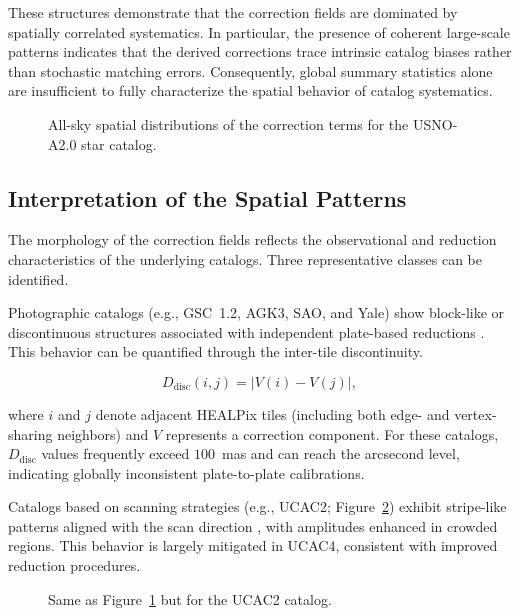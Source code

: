 \documentclass[linenumbers,amsmath,manuscript]{aastex702}
\begin{document}
These structures demonstrate that the correction fields are dominated by spatially correlated systematics. In particular, the presence of coherent large-scale patterns indicates that the derived corrections trace intrinsic catalog biases rather than stochastic matching errors. Consequently, global summary statistics alone are insufficient to fully characterize the spatial behavior of catalog systematics.

\begin{figure}[ht!]
\caption{All-sky spatial distributions of the correction terms for the USNO-A2.0 star catalog.}
\label{fig:bias_usno_a2_2x2}
\end{figure}

\subsection{Interpretation of the Spatial Patterns} \label{subsec:interpretation}

The morphology of the correction fields reflects the observational and reduction characteristics of the underlying catalogs. Three representative classes can be identified.

Photographic catalogs (e.g., GSC~1.2, AGK3, SAO, and Yale) show block-like or discontinuous structures associated with independent plate-based reductions \citep{Platais1998,Eichhorn1974}. This behavior can be quantified through the inter-tile discontinuity.

\begin{equation}
D_{\mathrm{disc}}(i,j)=|V(i)-V(j)|,
\end{equation}

where $i$ and $j$ denote adjacent HEALPix tiles (including both edge- and vertex-sharing neighbors) and $V$ represents a correction component. For these catalogs, $D_{\mathrm{disc}}$ values frequently exceed $100$~mas and can reach the arcsecond level, indicating globally inconsistent plate-to-plate calibrations.

Catalogs based on scanning strategies (e.g., UCAC2; Figure~\ref{fig:bias_ucac2_2x2}) exhibit stripe-like patterns aligned with the scan direction \citep{Zacharias2017UCAC5}, with amplitudes enhanced in crowded regions. This behavior is largely mitigated in UCAC4, consistent with improved reduction procedures.

\begin{figure}[ht!]
\caption{Same as Figure~\ref{fig:bias_usno_a2_2x2} but for the UCAC2 catalog.}
\label{fig:bias_ucac2_2x2}
\end{figure}
\end{document}

